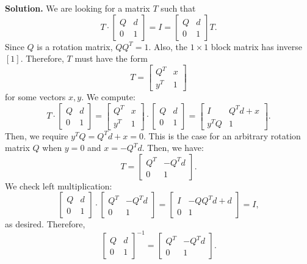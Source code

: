 \documentclass[11pt]{article}
\begin{document}
\textbf{Solution.}
We are looking for a matrix $T$ such that
\[
    T \cdot \begin{bmatrix} Q & d \\ 0 & 1 \end{bmatrix}  = I = \begin{bmatrix} Q & d \\ 0 & 1 \end{bmatrix} T
.\] 
Since $Q$ is a rotation matrix, $Q Q^{T} = 1$.
Also, the $1 \times 1$ block matrix has inverse $[1]$.
Therefore, $T$ must have the form
\[
    T = \begin{bmatrix} Q^{T} & x \\ y^{T} & 1 \end{bmatrix} 
\] 
for some vectors $x, y$.
We compute:
\[
    T \cdot \begin{bmatrix} Q & d \\ 0 & 1 \end{bmatrix} = \begin{bmatrix} Q^{T} & x \\ y^{T} & 1 \end{bmatrix} \cdot
\begin{bmatrix} Q & d \\ 0 & 1 \end{bmatrix}=  \begin{bmatrix} I & Q^{T}d + x \\ y^{T}Q & 1 \end{bmatrix} 
.\] 
Then, we require $y^{T} Q = Q^{T} d + x = 0$.
This is the case for an arbitrary rotation matrix $Q$ when $y = 0$ and $x = -Q^{T}d$.
Then, we have:
\[
    T = \begin{bmatrix} Q^{T} & -Q^{T}d \\ 0 & 1 \end{bmatrix} 
.\] 
We check left multiplication:
\[
    \begin{bmatrix} Q & d \\ 0 & 1 \end{bmatrix} \cdot \begin{bmatrix} Q^{T} & -Q^{T}d \\ 0 & 1 \end{bmatrix} = \begin{bmatrix} I & -QQ^{T}d + d \\ 0 & 1 \end{bmatrix} = I
,\] 
as desired.
Therefore,
\[
    \begin{bmatrix} Q & d \\ 0 & 1 \end{bmatrix}^{-1} = \begin{bmatrix} Q^{T} & -Q^{T}d \\ 0& 1  \end{bmatrix} 
.\] 
\end{document}
